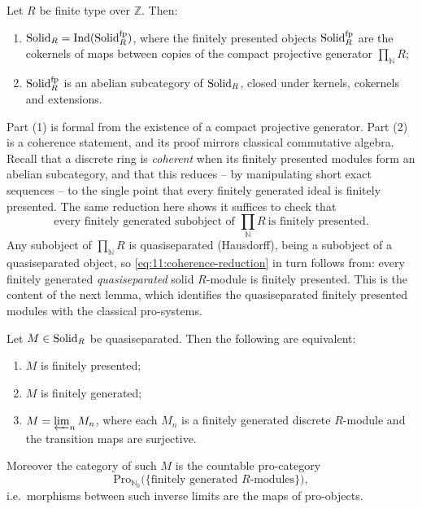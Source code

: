 \begin{theorem}[Coherence]
\label{thm:11:coherence}
Let $R$ be finite type over $\mathbb{Z}$. Then:
\begin{enumerate}
\item $\mathrm{Solid}_{R}=\operatorname{Ind}(\mathrm{Solid}_{R}^{\mathrm{fp}})$, where the finitely
presented objects $\mathrm{Solid}_{R}^{\mathrm{fp}}$ are the cokernels of maps between
copies of the compact projective generator $\prod_{\mathbb{N}}R$;
\item $\mathrm{Solid}_{R}^{\mathrm{fp}}$ is an abelian subcategory of $\mathrm{Solid}_{R}$,
closed under kernels, cokernels and extensions.
\end{enumerate}
\end{theorem}

Part (1) is formal from the existence of a compact projective generator. Part
(2) is a coherence statement, and its proof mirrors classical commutative
algebra. Recall that a discrete ring is \emph{coherent} when its finitely
presented modules form an abelian subcategory, and that this reduces -- by
manipulating short exact sequences -- to the single point that every finitely
generated ideal is finitely presented. The same reduction here shows it
suffices to check that
\begin{equation}
\label{eq:11:coherence-reduction}
\text{every finitely generated subobject of }\textstyle\prod_{\mathbb{N}}R\
\text{is finitely presented.}
\end{equation}
Any subobject of $\prod_{\mathbb{N}}R$ is quasiseparated (Hausdorff), being a
subobject of a quasiseparated object, so \eqref{eq:11:coherence-reduction} in
turn follows from: every finitely generated \emph{quasiseparated} solid
$R$-module is finitely presented. This is the content of the next lemma, which
identifies the quasiseparated finitely presented modules with the classical
pro-systems.

\begin{lemma}[Quasiseparated finitely presented $=$ pro-(f.g.\ modules)]
\label{lem:11:qsep-pro}
Let $M\in\mathrm{Solid}_{R}$ be quasiseparated. Then the following are equivalent:
\begin{enumerate}
\item $M$ is finitely presented;
\item $M$ is finitely generated;
\item $M=\varprojlim_{n}M_{n}$, where each $M_{n}$ is a finitely generated
discrete $R$-module and the transition maps are surjective.
\end{enumerate}
Moreover the category of such $M$ is the countable pro-category
\begin{equation*}
\mathrm{Pro}_{\mathbb{N}_{0}}\bigl(\{\text{finitely generated }R\text{-modules}
\}\bigr),
\end{equation*}
i.e.\ morphisms between such inverse limits are the maps of pro-objects.
\end{lemma}

